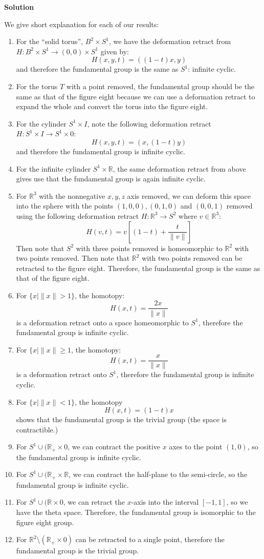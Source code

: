 \documentclass[12pt]{article}
\newcounter{AnswerCounter}
\newcounter{SubAnswerCounter}
\newenvironment{answer}[0]{
  \setcounter{SubAnswerCounter}{1}
  \bigskip
  \textbf{Solution \arabic{AnswerCounter}}
  \\
  \begin{small}
}{
  \end{small}
  \stepcounter{AnswerCounter}
}
\begin{document}
\begin{answer}[Page 366, \#2]
We give short explanation for each of our results:
\begin{enumerate}
\item For the ``solid torus'', $B^2 \times S^1$, we have the deformation retract from $H: B^2 \times S^1 \to (0,0) \times S^1$ given by:
$$
H(x,y,t) = ((1-t)x, y)
$$
and therefore the fundamental group is the same as $S^1$: infinite cyclic.
\item For the torus $T$ with a point removed, the fundamental group should be the same as that of the figure eight because we can use a deformation retract to expand the whole and convert the torus into the figure eight.
\item For the cylinder $S^1 \times I$, note the following deformation retract $H: S^1 \times I \to S^1 \times 0$:
$$
H(x,y, t) = (x, (1-t)y)
$$
and therefore the fundamental group is infinite cyclic.
\item For the infinite cylinder $S^1 \times \mathbb{R}$, the same deformation retract from above gives use that the fundamental group is again infinite cyclic.
\item For $\mathbb{R}^3$ with the nonnegative $x,y,z$ axis removed, we can deform this space into the sphere with the points $(1,0,0), (0,1,0)$ and $(0,0,1)$ removed using the following deformation retract $H: \mathbb{R}^3 \to S^2$ where $v \in \mathbb{R}^3$:
$$
H(v,t) = v\left[(1-t) + \frac{t}{\|v \|}\right]
$$
Then note that $S^2$ with three points removed is homeomorphic to $\mathbb{R}^2$ with two points removed. Then note that $\mathbb{R}^2$ with two points removed can be retracted to the figure eight. Therefore, the fundamental group is the same as that of the figure eight.
\item For $\{x \mid \|x\| > 1 \}$, the homotopy:
$$
H(x,t) = \frac{2x}{\|x \|}
$$
is a deformation retract onto a space homeomorphic to $S^1$, therefore the fundamental group is infinite cyclic.
\item For $\{x \mid \| x\| \geq 1$,  the homotopy:
$$
H(x,t) = \frac{x}{\| x\|}
$$
is a deformation retract onto $S^1$, therefore the fundamental group is infinite cyclic.
\item For $\{x \mid \|x\| < 1\}$, the homotopy
$$
H(x,t) = (1-t)x
$$
shows that the fundamental group is the trivial group (the space is contractible.)
\item For $S^1 \cup (\mathbb{R}_+ \times 0$, we can contract the positive $x$ axes to the point $(1,0)$, so the fundamental group is infinite cyclic.
\item For $S^1 \cup (\mathbb{R}_+ \times \mathbb{R}$, we can contract the half-plane to the semi-circle, so the fundamental group is infinite cyclic.
\item For $S^1 \cup (\mathbb{R} \times 0$, we can retract the $x$-axis into the interval $[-1,1]$, so we have the theta space. Therefore, the fundamental group is isomorphic to the figure eight group.
\item For $\mathbb{R}^2 \setminus (\mathbb{R}_+ \times 0)$ can be retracted to a single point, therefore the fundamental group is the trivial group.
\end{enumerate}
\end{answer}
\end{document}
